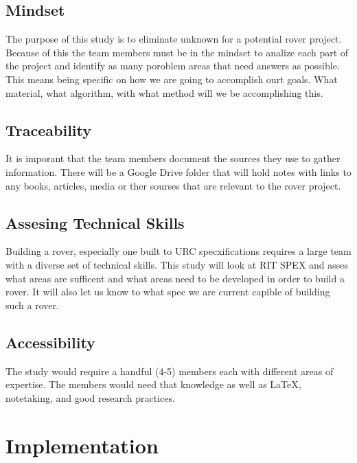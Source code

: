\documentclass[conference]{IEEEtran} %
\begin{document}

\subsection{Mindset}
\label{subsec:mindset}
The purpose of this study is to eliminate unknown for a potential rover project. 
Because of this the team members must be in the mindset to analize each part of the project and identify as many poroblem areas that need answers as possible. 
This means being specific on how we are going to accomplish ourt goals. 
What material, what algorithm, with what method will we be accomplishing this.

\subsection{Traceability}
\label{subsec:traceability}

It is imporant that the team members document the sources they use to gather information. 
There will be a Google Drive folder that will hold notes with links to any books, articles, media or ther sourses that are relevant to the rover project. 

\subsection{Assesing Technical Skills}
\label{subsec:assessing-technical-skills}

Building a rover, especially one built to URC specxifications requires a large team with a diverse set of technical skills. 
This study will look at RIT SPEX and asses what areas are sufficent and what areas need to be developed in order to build a rover. 
It will also let us know to what spec we are current capible of building such a rover. 

\subsection{Accessibility}
\label{subsec:plug-n-play}

The study would require a handful (4-5) members each with different areas of expertise. The members would need that knowledge as well as \LaTeX{}, notetaking, and good research practices.

\section{Implementation}
\label{sec:implementation}
\end{document}
